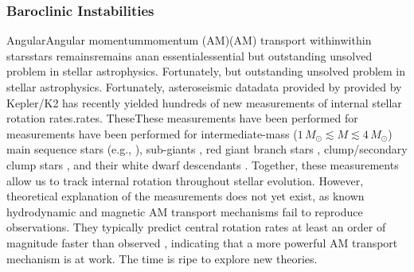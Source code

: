 {\color{orange}

{\color{orange}

\subsubsection{Baroclinic Instabilities}
}}

AngularAngular momentummomentum (AM)(AM) transport withinwithin starsstars remainsremains anan essentialessential but outstanding unsolved problem in stellar astrophysics. Fortunately, but outstanding unsolved problem in stellar astrophysics. Fortunately, asteroseismic datadata provided by provided by Kepler/K2 has recently yielded hundreds of new measurements of internal stellar rotation rates.rates. TheseThese measurements have been performed for measurements have been performed for intermediate-mass ($1 \, M_\odot \! \lesssim \! M \! \lesssim \! 4 \, M_\odot$) main sequence stars (e.g., \citealt{benomar:15,vanreeth:16}), sub-giants \citep{deheuvels:14}, red giant branch stars \citep{beck:12,mosser:12}, clump/secondary clump stars \citep{mosser:12,deheuvels:15}, and their white dwarf descendants \citep{hermes:17}. Together, these measurements allow us to track internal rotation throughout stellar evolution. However, theoretical explanation of the measurements does not yet exist, as known hydrodynamic and magnetic AM transport mechanisms fail to reproduce observations. They typically predict central rotation rates at least an order of magnitude faster than observed \citep{cantiello:14}, indicating that a more powerful AM transport mechanism is at work. The time is ripe to explore new theories.

